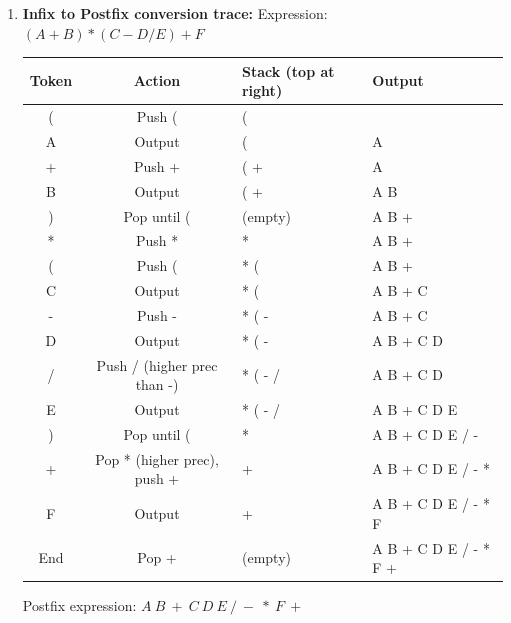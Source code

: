 \documentclass[11pt]{article}
\begin{document}
\begin{corrige}
\begin{enumerate}
\item \textbf{Infix to Postfix conversion trace:}
Expression: $(A + B) * (C - D / E) + F$

\begin{center}
\begin{tabularx}{\linewidth}{|c|c|X|X|}\hline
\rowcolor{popblueL}
\textbf{Token} & \textbf{Action} & \textbf{Stack (top at right)} & \textbf{Output} \\ \hline
( & Push ( & ( &  \\ \hline
A & Output & ( & A \\ \hline
+ & Push + & ( + & A \\ \hline
B & Output & ( + & A B \\ \hline
) & Pop until ( & (empty) & A B + \\ \hline
* & Push * & * & A B + \\ \hline
( & Push ( & * ( & A B + \\ \hline
C & Output & * ( & A B + C \\ \hline
- & Push - & * ( - & A B + C \\ \hline
D & Output & * ( - & A B + C D \\ \hline
/ & Push / (higher prec than -) & * ( - / & A B + C D \\ \hline
E & Output & * ( - / & A B + C D E \\ \hline
) & Pop until ( & * & A B + C D E / - \\ \hline
+ & Pop * (higher prec), push + & + & A B + C D E / - * \\ \hline
F & Output & + & A B + C D E / - * F \\ \hline
End & Pop + & (empty) & A B + C D E / - * F + \\ \hline
\end{tabularx}
\end{center}
Postfix expression: $A\ B\ +\ C\ D\ E\ /\ -\ *\ F\ +$


\end{enumerate}
\end{corrige}
\end{document}
